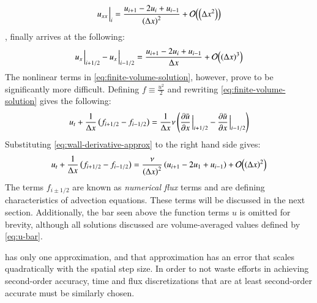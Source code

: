 \begin{equation}
	\label{eq:spatial-finite-difference-2nd-derivative}
	u_{xx}\eval_i=\frac{u_{i+1}-2u_i+u_{i-1}}{\left( \Delta x \right)^2}+\order{\left(\Delta x^2 \right)}
\end{equation}
, finally arrives at the following:
\begin{equation}
	\label{eq:wall-derivative-approx}
	u_x\eval_{i+1/2}-u_x\eval_{i-1/2}=\frac{u_{i+1}-2u_i+u_{i-1}}{\Delta x}+\order{ (\Delta x)^3}
\end{equation}
The nonlinear terms in \cref{eq:finite-volume-solution}, however, prove to be significantly more difficult.
Defining $f\equiv\frac{u^2}{2}$ and rewriting \cref{eq:finite-volume-solution} gives the following:
\begin{equation}
	\label{eq:burgers-equation-with-fluxes}
	u_t + \frac{1}{\Delta x}\left( f_{i+1/2}-f_{i-1/2} \right)=\frac{1}{\Delta x}\nu \left( \pdv{\bar{u}}{x}\eval_{i+1/2}-\pdv{\bar{u}}{x}\eval_{i-1/2} \right)
\end{equation}
Substituting \cref{eq:wall-derivative-approx} to the right hand side gives:
\begin{equation}
	\label{eq:burgers-eq-central-diff}
	u_t + \frac{1}{\Delta x}\left( f_{i+1/2}-f_{i-1/2} \right)=\frac{\nu }{\left( \Delta x \right)^2}\left( u_{i+1}-2u_1+u_{i-1} \right)+\order{\left( \Delta x\right)^2 }
\end{equation}
The terms $f_{i\pm 1/2}$ are known as \textit{numerical flux} terms and are defining characteristics of advection equations.
These terms will be discussed in the next section.
Additionally, the bar seen above the function terms $u$ is omitted for brevity, although all solutions discussed are volume-averaged values defined by \cref{eq:u-bar}.

 has only one approximation, and that approximation has an error that scales quadratically with the spatial step size.
In order to not waste efforts in achieving second-order accuracy, time and flux discretizations that are at least second-order accurate must be similarly chosen.